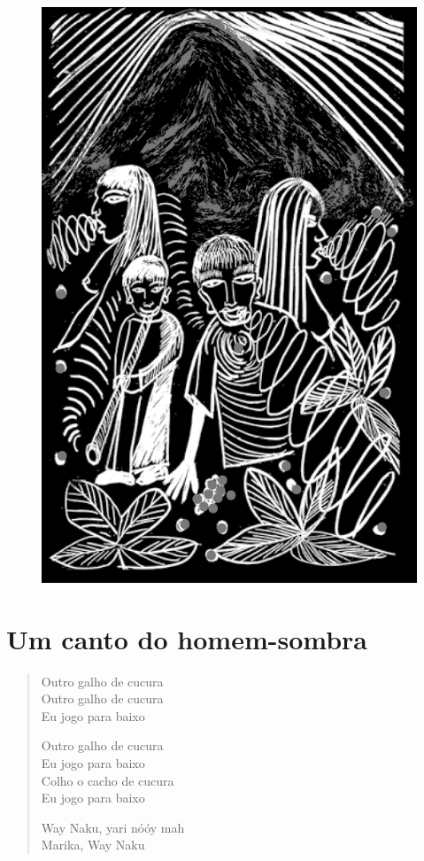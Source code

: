 \begin{figure}
\vspace*{-1.5cm}
\hspace*{-2.4cm}\includegraphics[width=142mm]{./imgs/img9.jpg}
\end{figure}

\chapter{Um canto do homem-sombra}

\begin{verse}
Outro galho de cucura\\
Outro galho de cucura\\
Eu jogo para baixo

Outro galho de cucura\\
Eu jogo para baixo\\
Colho o cacho de cucura\\
Eu jogo para baixo

Way Naku, yari nóóy mah\\
Marika, Way Naku
\end{verse}

